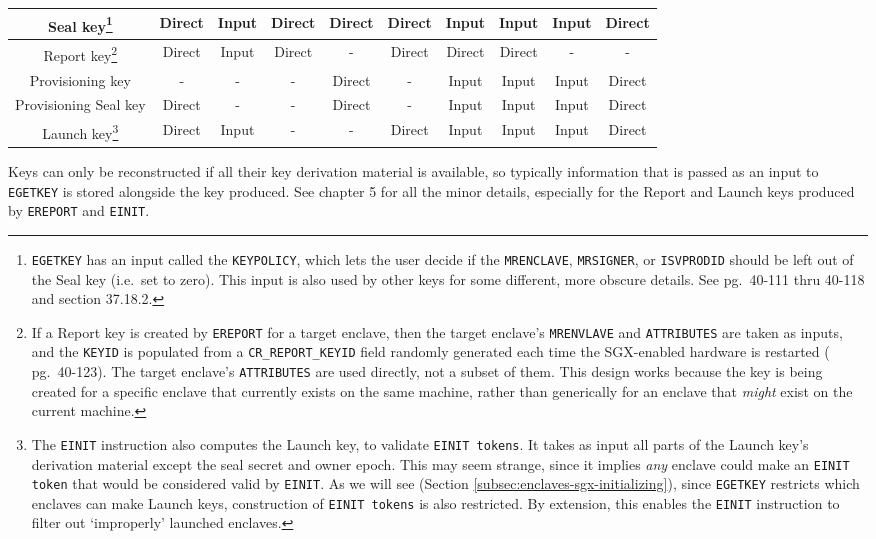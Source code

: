 \begin{tabularx}{1pt}{|c|c|c|c|c|c|c|c|c|c|}
\hline\hline
    Seal key\footnote{\label{footnote:sgx-seal-key-keypolicy}{\tt EGETKEY} has an input called the {\tt KEYPOLICY}, which lets the user decide if the {\tt MRENCLAVE}, {\tt MRSIGNER}, or {\tt ISVPRODID} should be left out of the Seal key (i.e.\ set to zero). This input is also used by other keys for some different, more obscure details. See \cite{sgx-manual} pg.\ 40-111 thru 40-118 and section 37.18.2.} &
    Direct &
    Input &
    Direct &
    Direct &
    Direct &
    Input &
    Input &
    Input &
    Direct \\
\hline
    Report key\footnote{If a Report key is created by {\tt EREPORT} for a target enclave, then the target enclave's {\tt MRENVLAVE} and {\tt ATTRIBUTES} are taken as inputs, and the {\tt KEYID} is populated from a {\tt CR\_REPORT\_KEYID} field randomly generated each time the SGX-enabled hardware is restarted (\cite{sgx-manual} pg.\ 40-123). The target enclave's {\tt ATTRIBUTES} are used directly, not a subset of them. This design works because the key is being created for a specific enclave that currently exists on the same machine, rather than generically for an enclave that {\em might} exist on the current machine.} &
    Direct &
    Input &
    Direct &
    - &
    Direct &
    Direct &
    Direct &
    - &
    - \\
\hline
    Provisioning key &
    - &
    - &
    - &
    Direct &
    - &
    Input &
    Input &
    Input &
    Direct \\
\hline
    Provisioning Seal key &
    Direct &
    - &
    - &
    Direct &
    - &
    Input &
    Input &
    Input &
    Direct \\
\hline
    Launch key\footnote{The {\tt EINIT} instruction also computes the Launch key, to validate {\tt EINIT tokens}. It takes as input all parts of the Launch key's derivation material except the seal secret and owner epoch. This may seem strange, since it implies {\em any} enclave could make an {\tt EINIT token} that would be considered valid by {\tt EINIT}. As we will see (Section \ref{subsec:enclaves-sgx-initializing}), since {\tt EGETKEY} restricts which enclaves can make Launch keys, construction of {\tt EINIT tokens} is also restricted. By extension, this enables the {\tt EINIT} instruction to filter out `improperly' launched enclaves.} &
    Direct &
    Input &
    - &
    - &
    Direct &
    Input &
    Input &
    Input &
    Direct \\
\hline
\end{tabularx}

Keys can only be reconstructed if all their key derivation material is available, so typically information that is passed as an input to {\tt EGETKEY} is stored alongside the key produced. See \cite{intel-sgx-explained-advanced} chapter 5 for all the minor details, especially for the Report and Launch keys produced by {\tt EREPORT} and {\tt EINIT}.

